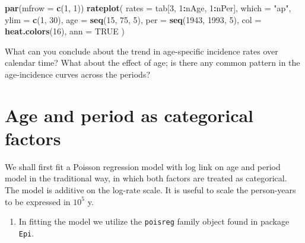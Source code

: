 \documentclass[
]{book}
\newenvironment{Shaded}{\begin{snugshade}}{\end{snugshade}}
\newcommand{\AttributeTok}[1]{\textcolor[rgb]{0.13,0.29,0.53}{#1}}
\newcommand{\ConstantTok}[1]{\textcolor[rgb]{0.56,0.35,0.01}{#1}}
\newcommand{\DecValTok}[1]{\textcolor[rgb]{0.00,0.00,0.81}{#1}}
\newcommand{\FunctionTok}[1]{\textcolor[rgb]{0.13,0.29,0.53}{\textbf{#1}}}
\newcommand{\NormalTok}[1]{#1}
\newcommand{\OtherTok}[1]{\textcolor[rgb]{0.56,0.35,0.01}{#1}}
\newcommand{\SpecialCharTok}[1]{\textcolor[rgb]{0.81,0.36,0.00}{\textbf{#1}}}
\newcommand{\StringTok}[1]{\textcolor[rgb]{0.31,0.60,0.02}{#1}}
\providecommand{\tightlist}{%
  \setlength{\itemsep}{0pt}\setlength{\parskip}{0pt}}
\begin{document}
\begin{Shaded}
\begin{Highlighting}[]
\FunctionTok{par}\NormalTok{(}\AttributeTok{mfrow =} \FunctionTok{c}\NormalTok{(}\DecValTok{1}\NormalTok{, }\DecValTok{1}\NormalTok{))}
\FunctionTok{rateplot}\NormalTok{(}
  \AttributeTok{rates =}\NormalTok{ tab[}\DecValTok{3}\NormalTok{, }\DecValTok{1}\SpecialCharTok{:}\NormalTok{nAge, }\DecValTok{1}\SpecialCharTok{:}\NormalTok{nPer], }\AttributeTok{which =} \StringTok{"ap"}\NormalTok{, }\AttributeTok{ylim =} \FunctionTok{c}\NormalTok{(}\DecValTok{1}\NormalTok{, }\DecValTok{30}\NormalTok{),}
  \AttributeTok{age =} \FunctionTok{seq}\NormalTok{(}\DecValTok{15}\NormalTok{, }\DecValTok{75}\NormalTok{, }\DecValTok{5}\NormalTok{), }\AttributeTok{per =} \FunctionTok{seq}\NormalTok{(}\DecValTok{1943}\NormalTok{, }\DecValTok{1993}\NormalTok{, }\DecValTok{5}\NormalTok{),}
  \AttributeTok{col =} \FunctionTok{heat.colors}\NormalTok{(}\DecValTok{16}\NormalTok{), }\AttributeTok{ann =} \ConstantTok{TRUE}
\NormalTok{)}
\end{Highlighting}
\end{Shaded}

What can you conclude about the trend in age-specific incidence rates
over calendar time? What about the effect of age;
is there any common pattern in the age-incidence curves across the periods?

\section{Age and period as categorical factors}\label{age-and-period-as-categorical-factors}

We shall first fit a Poisson regression model with log link
on age and period model in the traditional way,
in which both factors are treated as categorical.
The model is additive on the log-rate scale.
It is useful to scale the person-years to be expressed in \(10^5\) y.

\begin{enumerate}
\def\labelenumi{\arabic{enumi}.}
\tightlist
\item
  In fitting the model we utilize the \texttt{poisreg} family object
  found in package \texttt{Epi}.
\end{enumerate}

\begin{Shaded}
\end{Shaded}
\end{document}
